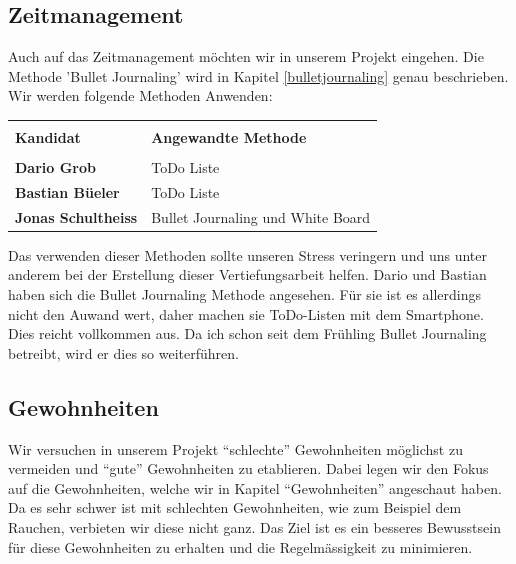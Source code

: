 \subsection{Zeitmanagement}
\authortoc{\jonas}{\subsectionident}
Auch auf das Zeitmanagement möchten wir in unserem Projekt eingehen. Die Methode 'Bullet Journaling' wird in Kapitel \ref{bulletjournaling} genau beschrieben. Wir werden folgende Methoden Anwenden:
\newline
\begin{table}[htp]
  \begin{tabularx}{\textwidth}{l X}\hline \\
    \textbf{Kandidat} & \textbf{Angewandte Methode}  \\\hline \\
    \textbf{Dario Grob} & ToDo Liste \\
    \textbf{Bastian Büeler} & ToDo Liste \\
    \textbf{Jonas Schultheiss} & Bullet Journaling und White Board
    \\\hline
  \end{tabularx}
\end{table}
\newline
Das verwenden dieser Methoden sollte unseren Stress veringern und uns unter anderem bei der Erstellung dieser Vertiefungsarbeit helfen. Dario und Bastian haben sich die Bullet Journaling Methode angesehen. Für sie ist es allerdings nicht den Auwand wert, daher machen sie ToDo-Listen mit dem Smartphone. Dies reicht vollkommen aus. Da ich schon seit dem Frühling Bullet Journaling betreibt, wird er dies so weiterführen.
\subsection{Gewohnheiten}
\authortoc{\dario}{\subsectionident}
Wir versuchen in unserem Projekt “schlechte” Gewohnheiten möglichst zu vermeiden und “gute” Gewohnheiten zu etablieren. Dabei legen wir den Fokus auf die Gewohnheiten, welche wir in Kapitel “Gewohnheiten” angeschaut haben.
\newline
Da es sehr schwer ist mit schlechten Gewohnheiten, wie zum Beispiel dem Rauchen, verbieten wir diese nicht ganz. Das Ziel ist es ein besseres Bewusstsein für diese Gewohnheiten zu erhalten und die Regelmässigkeit zu minimieren.
